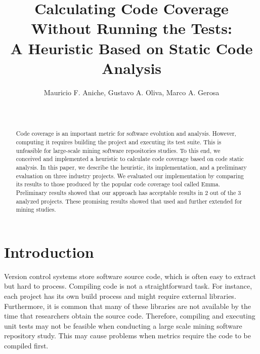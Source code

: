 \documentclass{sig-alternate}
\begin{document}

\title{Calculating Code Coverage Without Running the Tests:\\
A Heuristic Based on Static Code Analysis}

\author{
\alignauthor
Mauricio F. Aniche, Gustavo A. Oliva, Marco A. Gerosa\\
\\
\\
}

\maketitle
\begin{abstract}

Code coverage is an important metric for software evolution and analysis.
However, computing it requires building the project and executing its test suite.
This is unfeasible for large-scale mining software repositories studies. To this end,
we conceived and implemented a heuristic to calculate code coverage based on 
code static analysis. In this paper, we describe the heuristic, its implementation, 
and a preliminary evaluation on three industry projects. We evaluated our implementation by 
comparing its results to those produced by the popular code coverage tool called Emma. 
Preliminary results showed that our approach has acceptable results in 2 out of 
the 3 analyzed projects.
These promising results showed that used and further extended for mining studies.

\end{abstract}

\section{Introduction}
\label{sec:intro}

Version control systems store software source code, which is often easy to extract but hard to process. 
Compiling code is not a straightforward task. 
For instance, each project has its own build process and might require external libraries. Furthermore, 
it is common that many of these libraries are not available by the time 
that researchers obtain the source code. Therefore, compiling and executing 
unit tests may not be feasible when conducting a large scale mining software repository study.
This may cause problems when metrics 
require the code to be compiled first. 
\end{document}

